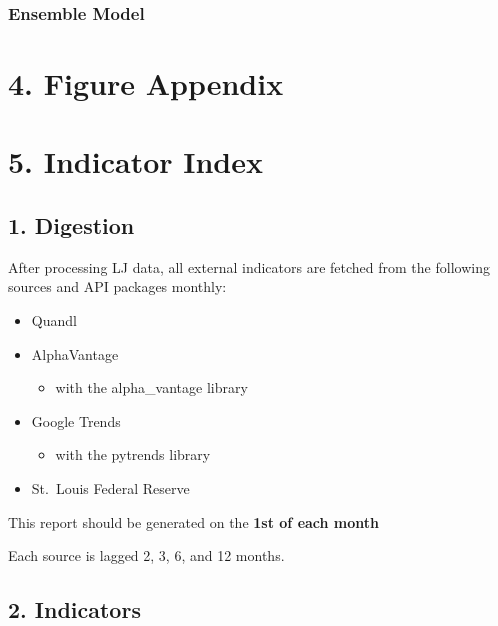 \documentclass[
]{article}
\providecommand{\tightlist}{%
  \setlength{\itemsep}{0pt}\setlength{\parskip}{0pt}}
\begin{document}
\hypertarget{ensemble-model}{%
\subsubsection{Ensemble Model}\label{ensemble-model}}

\hypertarget{figure-appendix}{%
\section{4. Figure Appendix}\label{figure-appendix}}

\hypertarget{indicator-index}{%
\section{5. Indicator Index}\label{indicator-index}}

\hypertarget{digestion}{%
\subsection{1. Digestion}\label{digestion}}

After processing LJ data, all external indicators are fetched from the
following sources and API packages monthly:

\begin{itemize}
\tightlist
\item
  Quandl
\item
  AlphaVantage

  \begin{itemize}
  \tightlist
  \item
    with the alpha\_vantage library
  \end{itemize}
\item
  Google Trends

  \begin{itemize}
  \tightlist
  \item
    with the pytrends library
  \end{itemize}
\item
  St.~Louis Federal Reserve
\end{itemize}

This report should be generated on the \textbf{1st of each month}

Each source is lagged 2, 3, 6, and 12 months.

\hypertarget{indicators}{%
\subsection{2. Indicators}\label{indicators}}
\end{document}
